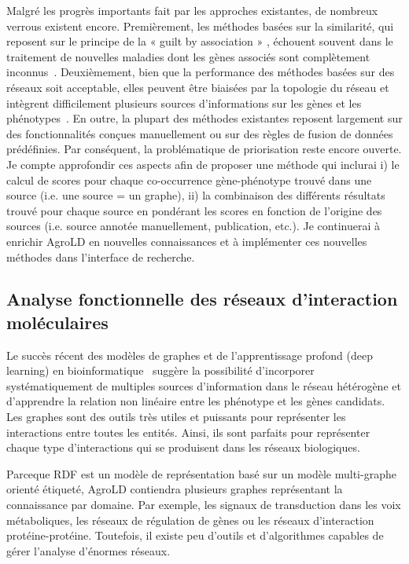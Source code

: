 Malgré les progrès importants fait par les approches existantes, de nombreux verrous existent encore. Premièrement, les méthodes basées sur la similarité, qui reposent sur le principe de la  « guilt by association » , échouent souvent dans le traitement de nouvelles maladies dont les gènes associés sont complètement inconnus~\cite{zakeri2018}. Deuxièmement, bien que la performance des méthodes basées sur des réseaux soit acceptable, elles peuvent être biaisées par la topologie du réseau et intègrent difficilement plusieurs sources d'informations sur les gènes et les phénotypes~\cite{Moreau2012}. En outre, la plupart des méthodes existantes reposent largement sur des fonctionnalités conçues manuellement ou sur des règles de fusion de données prédéfinies. Par conséquent, la problématique de priorisation reste encore ouverte. \\

Je compte approfondir ces aspects afin de proposer une méthode qui inclurai i) le calcul de scores pour chaque co-occurrence gène-phénotype trouvé dans une source (i.e. une source = un graphe), ii) la combinaison des différents résultats trouvé pour chaque source en pondérant les scores en fonction de l’origine des sources (i.e. source annotée manuellement, publication, etc.). Je continuerai à enrichir AgroLD en nouvelles connaissances et à implémenter ces nouvelles méthodes dans l’interface de recherche. 

\subsection{Analyse fonctionnelle des réseaux d'interaction moléculaires}
Le succès récent des modèles de graphes et de l'apprentissage profond (deep learning) en bioinformatique~\cite{zitnik2018,li2018,sequence2vec2017,kim2018,xia2018} suggère la possibilité d’incorporer systématiquement de multiples sources d’information dans le réseau hétérogène et d’apprendre la relation non linéaire entre les phénotype et les gènes candidats. Les graphes sont des outils très utiles et puissants pour représenter les interactions entre toutes les entités. Ainsi, ils sont parfaits pour représenter chaque type d'interactions qui se produisent dans les réseaux biologiques.

Parceque RDF est un modèle de représentation basé sur un modèle multi-graphe orienté étiqueté, AgroLD contiendra plusieurs graphes représentant la connaissance par domaine. Par exemple, les signaux de transduction dans les voix métaboliques, les réseaux de régulation de gènes ou les réseaux d'interaction protéine-protéine. Toutefois, il existe peu d'outils et d'algorithmes capables de gérer l'analyse d'énormes réseaux.

